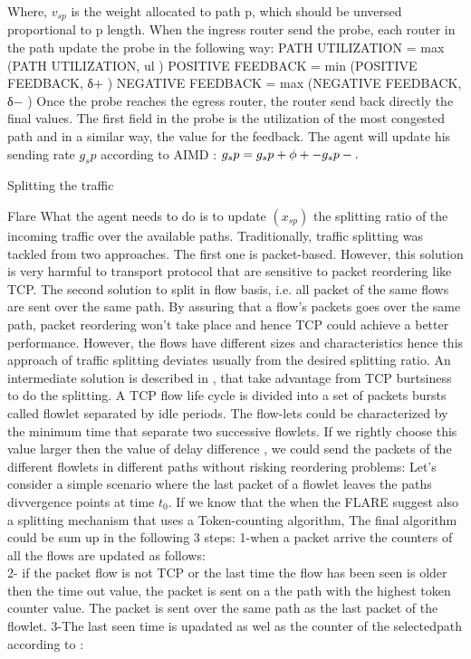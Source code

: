 \begin {equation}
\end {equation}
Where,  $v_{sp}$ is the weight allocated to path p, which should be unversed proportional to p length.
When the ingress router send the probe, each router in the path update the probe in the following way:
PATH UTILIZATION =  max (PATH UTILIZATION, ul ) 
POSITIVE FEEDBACK =  min (POSITIVE FEEDBACK, δ+ ) 
NEGATIVE FEEDBACK =  max (NEGATIVE FEEDBACK, δ− ) 
Once the probe reaches the egress router, the router send back directly the final values. The first field in the probe is the utilization of the most congested path and in a similar way, the value for the feedback. The agent will update his sending rate $g_sp$ according to AIMD :
$g_sp = g_sp + \phi+ - g_sp \time \phi-.$

Splitting the traffic

Flare
What the agent needs to do is to update $(x_{sp})$ the splitting ratio of the incoming traffic over the available paths. Traditionally, traffic splitting was tackled from  two approaches. The first one is packet-based. However, this solution is very harmful to transport protocol that are sensitive to packet reordering like TCP.  The second solution to split in flow basis, i.e. all packet of the same flows are sent over the same path. By assuring that a flow's packets goes over the same path, packet reordering won't take place and hence TCP could achieve a better performance. However, the flows have different sizes and characteristics hence this approach of traffic splitting deviates usually from the desired splitting ratio. An intermediate solution is described in \cite {flowlet}, that take advantage from TCP burtsiness to do the splitting. A TCP flow life cycle is divided into a set of packets bursts called flowlet separated by idle periods. The flow-lets could be characterized by the minimum time that separate two successive flowlets.  If we rightly choose this value larger then the value of delay difference , we could send the packets of the different flowlets in different paths without risking reordering problems: Let's consider a simple scenario where the last packet of a flowlet leaves the paths divvergence points at time $t_0$. If we know that the when the 
FLARE suggest also a splitting mechanism that uses a Token-counting algorithm, 
The final algorithm could be sum up in the following 3 steps:
	1-when a packet arrive the counters of all the flows are updated as follows:
\begin{equation}
\end{equation}
	2- if the packet flow is not TCP or the last time the flow has been seen is older then the time out value, the packet is sent on a the path with the highest token counter value. The packet is sent over the same path as the last packet of the flowlet.
	3-The last seen time is upadated as wel as the counter of the selectedpath according to :
\begin{equation}
\end{equation}

